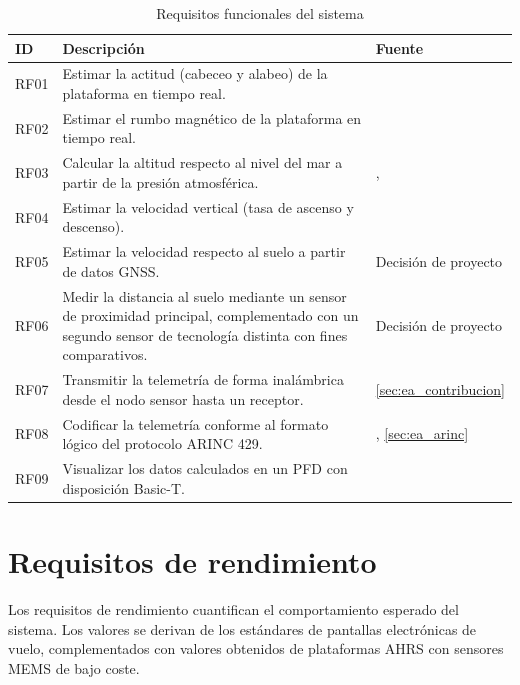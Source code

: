 \begin{table}[H]
    \centering
    \caption{Requisitos funcionales del sistema}
    \label{tab:req_funcionales}
    \begin{tabularx}{\linewidth}{l X l}
        \toprule
        \textbf{ID} & \textbf{Descripción} & \textbf{Fuente} \\
        \midrule
        RF01 & Estimar la actitud (cabeceo y alabeo) de la plataforma en tiempo real. & \cite{ac25_11b} \\
        RF02 & Estimar el rumbo magnético de la plataforma en tiempo real. & \cite{ac25_11b} \\
        RF03 & Calcular la altitud respecto al nivel del mar a partir de la presión atmosférica. & \cite{icao_isa}, \cite{ac25_11b} \\
        RF04 & Estimar la velocidad vertical (tasa de ascenso y descenso). & \cite{ac25_11b} \\
        RF05 & Estimar la velocidad respecto al suelo a partir de datos GNSS. & Decisión de proyecto \\
        RF06 & Medir la distancia al suelo mediante un sensor de proximidad principal, complementado con un segundo sensor de tecnología distinta con fines comparativos. & Decisión de proyecto \\
        RF07 & Transmitir la telemetría de forma inalámbrica desde el nodo sensor hasta un receptor. & \cref{sec:ea_contribucion} \\
        RF08 & Codificar la telemetría conforme al formato lógico del protocolo ARINC 429. & \cite{arinc429}, \cref{sec:ea_arinc} \\
        RF09 & Visualizar los datos calculados en un PFD con disposición Basic-T. & \cite{ac25_11b} \\
        \bottomrule
    \end{tabularx}
\end{table}


\section{Requisitos de rendimiento}
\label{sec:req_rendimiento}

Los requisitos de rendimiento cuantifican el comportamiento esperado del sistema.
Los valores se derivan de los estándares de pantallas electrónicas de vuelo, complementados con valores obtenidos de plataformas AHRS con sensores MEMS de bajo coste.

